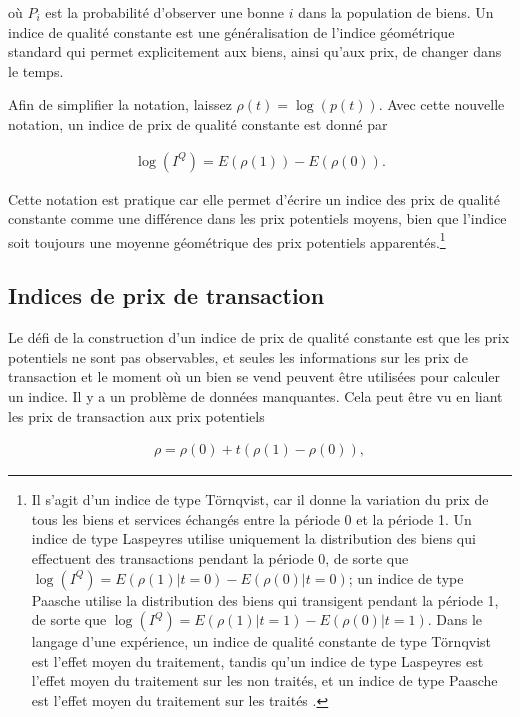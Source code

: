 \documentclass[
]{article}
\begin{document}
où \(P_{i}\) est la probabilité d'observer une bonne \(i\) dans la population de biens. Un indice de qualité constante est une généralisation de l'indice géométrique standard qui permet explicitement aux biens, ainsi qu'aux prix, de changer dans le temps.

Afin de simplifier la notation, laissez \(\rho(t) = \log(p(t))\). Avec cette nouvelle notation, un indice de prix de qualité constante est donné par

\begin{align*}
\log (I^{Q}) = E(\rho(1)) - E(\rho(0)).
\end{align*}

Cette notation est pratique car elle permet d'écrire un indice des prix de qualité constante comme une différence dans les prix potentiels moyens, bien que l'indice soit toujours une moyenne géométrique des prix potentiels apparentés.\footnote{Il s'agit d'un indice de type Törnqvist, car il donne la variation du prix de tous les biens et services échangés entre la période 0 et la période 1. Un indice de type Laspeyres utilise uniquement la distribution des biens qui effectuent des transactions pendant la période 0, de sorte que \(\log(I^{Q}) = E(\rho(1) | t = 0) - E(\rho(0) | t = 0)\); un indice de type Paasche utilise la distribution des biens qui transigent pendant la période 1, de sorte que \(\log(I^{Q}) = E(\rho(1) | t = 1) - E(\rho(0) | t = 1)\). Dans le langage d'une expérience, un indice de qualité constante de type Törnqvist est l'effet moyen du traitement, tandis qu'un indice de type Laspeyres est l'effet moyen du traitement sur les non traités, et un indice de type Paasche est l'effet moyen du traitement sur les traités .}

\hypertarget{indices-de-prix-de-transaction}{%
\subsection{Indices de prix de transaction}\label{indices-de-prix-de-transaction}}

Le défi de la construction d'un indice de prix de qualité constante est que les prix potentiels ne sont pas observables, et seules les informations sur les prix de transaction et le moment où un bien se vend peuvent être utilisées pour calculer un indice. Il y a un problème de données manquantes. Cela peut être vu en liant les prix de transaction aux prix potentiels

\begin{align*}
\rho = \rho(0) + t (\rho(1) - \rho(0)),
\end{align*}
\end{document}
